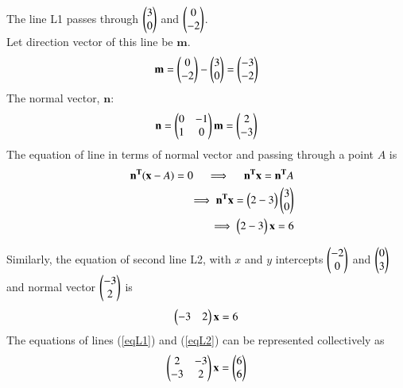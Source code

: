 \documentclass[journal,12pt,twocolumn]{IEEEtran}
\begin{document}
\noindent
The line L1 passes through $\begin{pmatrix}3 \\ 0\end{pmatrix}$ and $\begin{pmatrix}0 \\ -2\end{pmatrix}$. \\

\noindent Let direction vector of this line be $\mathbf{m}$.
\begin{align}
	\mathbf{m} = \begin{pmatrix}0\\-2\end{pmatrix} - \begin{pmatrix}3\\0\end{pmatrix} = \begin{pmatrix}-3\\-2\end{pmatrix}
\end{align}
The normal vector, $\mathbf{n}$: 
\begin{align}
	{\mathbf{n}} = \begin{pmatrix}0 & -1 \\ 1 & 0\end{pmatrix}\mathbf{m} = \begin{pmatrix}2 \\ -3\end{pmatrix}
\end{align}
The equation of line in terms of normal vector and passing through a point 
$A$ is
\begin{align}
	\quad \mathbf{n^T}(\mathbf{x} - A ) = 0
	\quad \implies \quad \mathbf{n^Tx} = \mathbf{n^T}A \\
	\implies \mathbf{n^Tx}= \begin{pmatrix}2 -3\end{pmatrix}\begin{pmatrix}3 \\ 0\end{pmatrix} \\
	\implies \begin{pmatrix}2 -3\end{pmatrix}\mathbf{x} = 6	\label{eqL1}
\end{align}

\noindent Similarly, the equation of second line L2, with $x$ and 
$y$ intercepts $\begin{pmatrix} -2 \\ 0\end{pmatrix}$ and $\begin{pmatrix} 0 \\ 3\end{pmatrix}$ and 
normal vector $\begin{pmatrix} -3 \\ 2\end{pmatrix}$ is
\begin{align}
	\begin{pmatrix}-3 &  2 \end{pmatrix} {\mathbf{x}} = 6	\label{eqL2}
\end{align}
The equations of lines (\ref{eqL1}) and (\ref{eqL2}) can be represented 
collectively as
\begin{align}
	\begin{pmatrix}2 & -3 \\ -3 & 2\end{pmatrix}\mathbf{x} = \begin{pmatrix}6 \\ 6\end{pmatrix}
\end{align}
\end{document}
